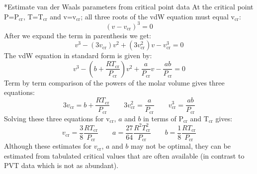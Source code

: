 \documentclass[11pt]{article}
\makeatletter
\theoremstyle{definition}
\renewcommand\paragraph{\@startsection
	{paragraph}{2}{0mm}
	{-0.05in}
	{-0.5\baselineskip}
	{\normalfont\normalsize\itshape}}
\makeatother
\begin{document}
\paragraph*{Estimate van der Waals parameters from critical point data}
At the critical point P=P$_{\mathrm{cr}}$, T=T$_{\mathrm{cr}}$ and v=v$_{\mathrm{cr}}$;
all three roots of the vdW equation must equal v$_{\mathrm{cr}}$:
\begin{equation}
  \left(v-v_{\mathrm{cr}}\right)^3 = 0
\end{equation}
After we expand the term in parenthesis we get:
\begin{equation}
v^3-\left(3v_{\mathrm{cr}}\right)v^2+\left(3v^{2}_{\mathrm{cr}}\right)v-v^{3}_{\mathrm{cr}} = 0
\end{equation}
The vdW equation in standard form is given by:
\begin{equation}
  v^3-\left(b+\frac{RT_{\mathrm{cr}}}{P_{\mathrm{cr}}}\right)v^2+\frac{a}{P_{\mathrm{cr}}}v-\frac{ab}{P_{\mathrm{cr}}} = 0
\end{equation}
Term by term comparison of the powers of the molar volume gives three equations:
\begin{equation}
  3v_{\mathrm{cr}} = b+\frac{RT_{\mathrm{cr}}}{P_{\mathrm{cr}}}\qquad
  3v^{2}_{\mathrm{cr}} = \frac{a}{P_{\mathrm{cr}}}\qquad
  v^{3}_{\mathrm{cr}} = \frac{ab}{P_{\mathrm{cr}}}
\end{equation}
Solving these three equations for v$_{\mathrm{cr}}$, $a$ and $b$ in terms of P$_{\mathrm{cr}}$ and T$_{\mathrm{cr}}$ gives:
\begin{equation}
  v_{\mathrm{cr}} = \frac{3}{8}\frac{RT_{\mathrm{cr}}}{P_{\mathrm{\mathrm{cr}}}}\qquad
  a = \frac{27}{64}\frac{R^{2}T^{2}_{\mathrm{cr}}}{P_{\mathrm{cr}}}\qquad
  b = \frac{1}{8}\frac{RT_{\mathrm{cr}}}{P_{\mathrm{cr}}}
\end{equation}
Although these estimates for $v_{\mathrm{cr}}$, $a$ and $b$ may not be optimal, they can be estimated from
tabulated critical values that are often available (in contrast to PVT data which is not as abundant).

\end{document}
